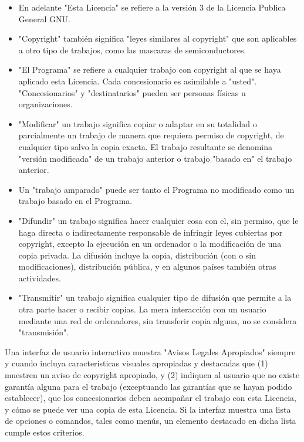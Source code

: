 \begin{itemize}
	
	\item En adelante "Esta Licencia" se refiere a la versión 3 de la Licencia Publica General GNU.
	
	\item "Copyright" también significa "leyes similares al copyright" que son aplicables a otro tipo de trabajos, como las mascaras de semiconductores.\\
	
	\item "El Programa" se refiere a cualquier trabajo con copyright al que se haya aplicado esta Licencia. Cada concesionario es asimilable a "usted". "Concesionarios" y	"destinatarios" pueden ser personas físicas u organizaciones.\\
	
	\item "Modificar" un trabajo significa copiar o adaptar en su totalidad o parcialmente	un trabajo de manera que requiera permiso de copyright, de cualquier tipo salvo la copia exacta. El trabajo resultante se denomina "versión modificada" de un trabajo anterior o trabajo "basado en" el trabajo anterior.\\
	
	\item Un "trabajo amparado" puede ser tanto el Programa no modificado como un trabajo basado en el Programa.\\
	
	\item "Difundir" un trabajo significa hacer cualquier cosa con el, sin permiso, que le haga directa o indirectamente responsable de infringir leyes cubiertas por copyright, excepto la ejecución en un ordenador o la modificación de una copia privada. La difusión incluye la copia, distribución (con o sin modificaciones), distribución pública,
	y en algunos países también otras actividades.\\
	
	\item "Transmitir" un trabajo significa cualquier tipo de difusión que permite a la otra parte hacer o recibir copias. La mera interacción con un usuario mediante una red de ordenadores, sin transferir copia alguna, no se considera "transmisión".\\

\end{itemize}

 Una interfaz de usuario interactivo muestra "Avisos Legales Apropiados" siempre	y cuando incluya características visuales apropiadas y destacadas que (1) muestren un aviso de copyright apropiado, y (2) indiquen al usuario que no existe garantía alguna para el trabajo (exceptuando las garantías que se hayan podido establecer), que  los  concesionarios  deben  acompañar  el  trabajo  con  esta  Licencia,  y  cómo  se puede ver una copia de esta Licencia. Si la interfaz muestra una lista de opciones o comandos, tales como menús, un elemento destacado en dicha lista cumple estos criterios.\\

